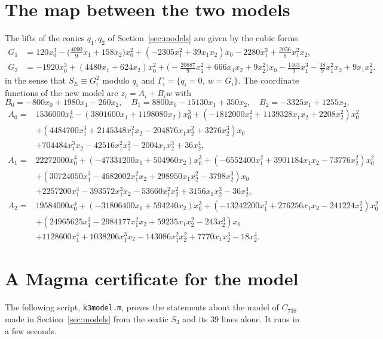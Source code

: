\documentclass[11pt]{article}
\theoremstyle{remark}
\begin{document}
\section{The map between the two models}\label{app:map}
The lifts of the conics $q_1,q_2$ of Section~\ref{sec:models} are given by the cubic forms
{\small
\begin{align*}
G_1&=120x_0^3-\bigl(\tfrac{4090}{9}x_1+158x_2\bigr)x_0^2+(-2305x_1^2+39x_1x_2)x_0-2280x_1^3+\tfrac{2056}{9}x_1^2x_2,\\
G_2&=-1920x_0^3+(4480x_1+624x_2)x_0^2+\bigl(-\tfrac{20887}{9}x_1^2+666x_1x_2+9x_2^2\bigr)x_0-\tfrac{1463}{9}x_1^3-\tfrac{38}{9}x_1^2x_2+9x_1x_2^2 .
\end{align*}}
in the sense that $S_E\equiv G_i^2$ modulo $q_i$ and $\Gamma_i=\{q_i=0,\ w=G_i\}$.  The coordinate functions of the new model are
$z_i=A_i+B_iw$ with
\[
B_0=-800x_0+1980x_1-260x_2,\quad B_1=8800x_0-15130x_1+350x_2,\quad B_2=-3325x_1+1255x_2,
\]
{\small
\begin{align*}
A_0={}&1536000x_0^4-(3801600x_1+1198080x_2)x_0^3+(-1812000x_1^2+1139328x_1x_2+2208x_2^2)x_0^2\\
&+(4484700x_1^3+2145348x_1^2x_2-204876x_1x_2^2+3276x_2^3)x_0\\
&+704484x_1^3x_2-42516x_1^2x_2^2-2004x_1x_2^3+36x_2^4,\\
A_1={}&22272000x_0^4+(-47331200x_1+504960x_2)x_0^3+(-6552400x_1^2+3901184x_1x_2-73776x_2^2)x_0^2\\
&+(30724050x_1^3-4682002x_1^2x_2+298950x_1x_2^2-3798x_2^3)x_0\\
&+2257200x_1^4-393572x_1^3x_2-53660x_1^2x_2^2+3156x_1x_2^3-36x_2^4,\\
A_2={}&19584000x_0^4+(-31806400x_1+594240x_2)x_0^3+(-13242200x_1^2+276256x_1x_2-241224x_2^2)x_0^2\\
&+(24965625x_1^3-2984177x_1^2x_2+59235x_1x_2^2-243x_2^3)x_0\\
&+1128600x_1^4+1038206x_1^3x_2-143086x_1^2x_2^2+7770x_1x_2^3-18x_2^4 .
\end{align*}}

\section{A Magma certificate for the model}\label{app:magma}
The following script, \texttt{k3model.m}, proves the statements about the model of $C_{738}$ made in Section~\ref{sec:models} from
the sextic $S_3$ and its $39$ lines alone.  It runs in a few seconds.
{\fontsize{7}{8.6}\selectfont}
\end{document}

